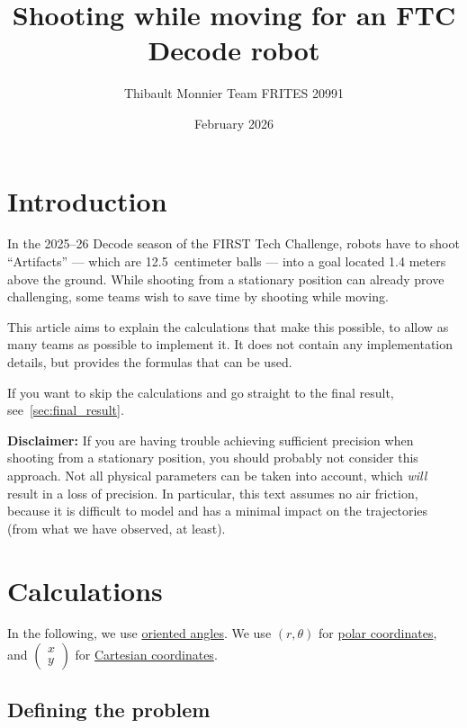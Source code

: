 \documentclass[11pt]{report}
\title{Shooting while moving for an FTC Decode robot}
\author{Thibault Monnier \textendash{} Team FRITES 20991}
\date{February 2026}
\begin{document}
\maketitle

\chapter{Introduction}

In the 2025--26 Decode season of the FIRST Tech Challenge, robots have to shoot
``Artifacts'' --- which are 12.5~centimeter balls --- into a goal located 1.4 meters
above the ground. While shooting from a stationary position can already prove
challenging, some teams wish to save time by shooting while moving.

This article aims to explain the calculations that make this possible, to allow
as many teams as possible to implement it. It does not contain any
implementation details, but provides the formulas that can be used.

If you want to skip the calculations and go straight to the final result, see~\ref{sec:final_result}.

\bigskip

\textbf{Disclaimer:} If you are having trouble achieving sufficient precision when shooting from a stationary position, you should probably not consider this approach. Not all physical parameters can be taken into account, which \textit{will} result in a loss of precision.
In particular, this text assumes no air friction, because it is difficult to model and has a minimal impact on the trajectories (from what we have observed, at least).


\chapter{Calculations}

In the following, we use
\href{https://en.wikipedia.org/wiki/Angle#Signed_angles}{oriented angles}. We use $(r, \theta)$ for \href{https://en.wikipedia.org/wiki/Polar_coordinate_system}{polar coordinates}, and $\begin{pmatrix}
		x \\
		y
	\end{pmatrix}$ for \href{https://en.wikipedia.org/wiki/Cartesian_coordinate_system}{Cartesian coordinates}.

\section{Defining the problem}
\end{document}
